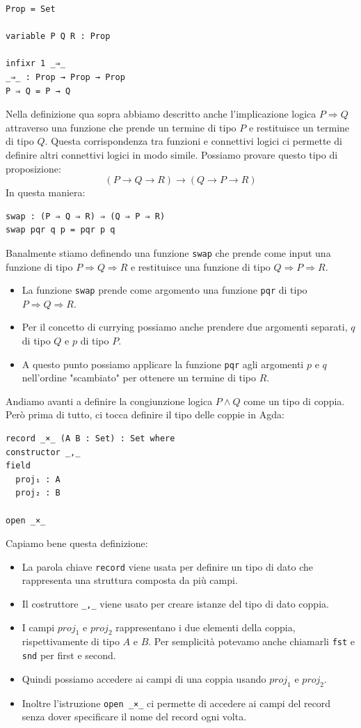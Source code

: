 \documentclass[a4paper]{article}
\theoremstyle{definition}
\theoremstyle{remark}
\begin{document}
\begin{verbatim}
Prop = Set

variable P Q R : Prop

infixr 1 _⇒_
_⇒_ : Prop → Prop → Prop
P ⇒ Q = P → Q
\end{verbatim}
Nella definizione qua sopra abbiamo descritto anche l'implicazione logica \( P ⇒ Q \)
attraverso una funzione che prende un termine di tipo \( P \) e restituisce un termine di tipo \( Q \).
Questa corrispondenza tra funzioni e connettivi logici ci permette di definire altri connettivi logici in modo simile.
Possiamo provare questo tipo di proposizione:
\[(P \to Q \to R) \to (Q \to P \to R)\]
In questa maniera:
\begin{verbatim}
swap : (P ⇒ Q ⇒ R) ⇒ (Q ⇒ P ⇒ R)
swap pqr q p = pqr p q
\end{verbatim}
Banalmente stiamo definendo una funzione \texttt{swap} che prende come input una funzione
di tipo \( P ⇒ Q ⇒ R \) e restituisce una funzione di tipo \( Q ⇒ P ⇒ R \).
\begin{itemize}
  \item La funzione \texttt{swap} prende come argomento una funzione \texttt{pqr} di tipo \( P ⇒ Q ⇒ R \).
  \item Per il concetto di currying possiamo anche prendere due argomenti separati, \( q \) di tipo \( Q \) e \( p \) di tipo \( P \).
  \item A questo punto possiamo applicare la funzione \texttt{pqr} agli argomenti \( p \) e \( q \) nell'ordine "scambiato" per ottenere un termine di tipo \( R \).
\end{itemize}
Andiamo avanti a definire la congiunzione logica \( P ∧ Q \) come un tipo di coppia.
Però prima di tutto, ci tocca definire il tipo delle coppie in Agda:
\begin{verbatim}
record _×_ (A B : Set) : Set where
constructor _,_
field
  proj₁ : A
  proj₂ : B

open _×_
\end{verbatim}
Capiamo bene questa definizione:
\begin{itemize}
  \item La parola chiave \texttt{record} viene usata per definire un tipo di dato che rappresenta una struttura composta da più campi.
  \item Il costruttore \texttt{\_,\_} viene usato per creare istanze del tipo di dato coppia.
  \item I campi $proj_1$ e $proj_2$ rappresentano i due elementi della coppia, rispettivamente di tipo \( A \) e \( B \).
  Per semplicità potevamo anche chiamarli \texttt{fst} e \texttt{snd} per first e second.
  \item Quindi possiamo accedere ai campi di una coppia usando $proj_1$ e $proj_2$.
  \item Inoltre l'istruzione \texttt{open \_×\_} ci permette di accedere ai campi del record senza dover specificare il nome del record ogni volta.
\end{itemize}
\end{document}
